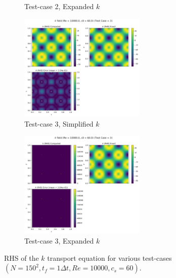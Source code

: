 \begin{figure}[htbp!]
\begin{subfigure}{7cm}
    \caption{Test-case 2, Expanded $k$}
  \end{subfigure}
  \begin{subfigure}{7cm}
    \centering\includegraphics[width=6cm]{Code-Figures/keps/keps-op-conv/c0_60_ke_expd_no_ketc_3_nx_150_re_10000/k_rhs.png}
    \caption{Test-case 3, Simplified $k$}
  \end{subfigure}
  \begin{subfigure}{7cm}
    \centering\includegraphics[width=6cm]{Code-Figures/keps/keps-op-conv/c0_60_ke_expd_yes_ketc_3_nx_150_re_10000/k_rhs.png}
    \caption{Test-case 3, Expanded $k$}
  \end{subfigure}
  \caption{RHS of the $k$ transport equation for various test-cases $(N=150^2, t_f=1\Delta t, Re=10000, c_s=60)$.}
  \label{fig:k-spatial-ooc-field}
\end{figure}

